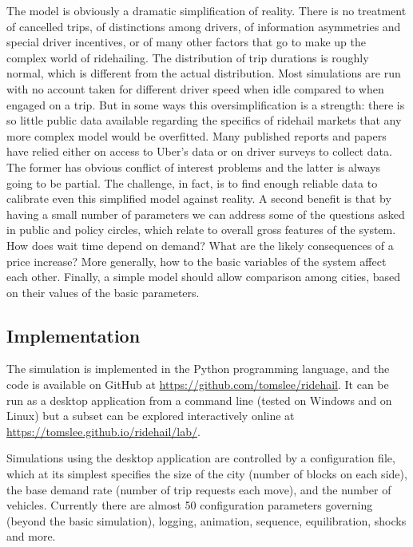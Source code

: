 \documentclass[
  letterpaper,
]{article}
\begin{document}
The model is obviously a dramatic simplification of reality. There is no
treatment of cancelled trips, of distinctions among drivers, of
information asymmetries and special driver incentives, or of many other
factors that go to make up the complex world of ridehailing. The
distribution of trip durations is roughly normal, which is different
from the actual distribution. Most simulations are run with no account
taken for different driver speed when idle compared to when engaged on a
trip. But in some ways this oversimplification is a strength: there is
so little public data available regarding the specifics of ridehail
markets that any more complex model would be overfitted. Many published
reports and papers have relied either on access to Uber's data or on
driver surveys to collect data. The former has obvious conflict of
interest problems and the latter is always going to be partial. The
challenge, in fact, is to find enough reliable data to calibrate even
this simplified model against reality. A second benefit is that by
having a small number of parameters we can address some of the questions
asked in public and policy circles, which relate to overall gross
features of the system. How does wait time depend on demand? What are
the likely consequences of a price increase? More generally, how to the
basic variables of the system affect each other. Finally, a simple model
should allow comparison among cities, based on their values of the basic
parameters.

\hypertarget{implementation}{%
\subsection{Implementation}\label{implementation}}

The simulation is implemented in the Python programming language, and
the code is available on GitHub at
\url{https://github.com/tomslee/ridehail}. It can be run as a desktop
application from a command line (tested on Windows and on Linux) but a
subset can be explored interactively online at
\url{https://tomslee.github.io/ridehail/lab/}.

Simulations using the desktop application are controlled by a
configuration file, which at its simplest specifies the size of the city
(number of blocks on each side), the base demand rate (number of trip
requests each move), and the number of vehicles. Currently there are
almost 50 configuration parameters governing (beyond the basic
simulation), logging, animation, sequence, equilibration, shocks and
more.
\end{document}
